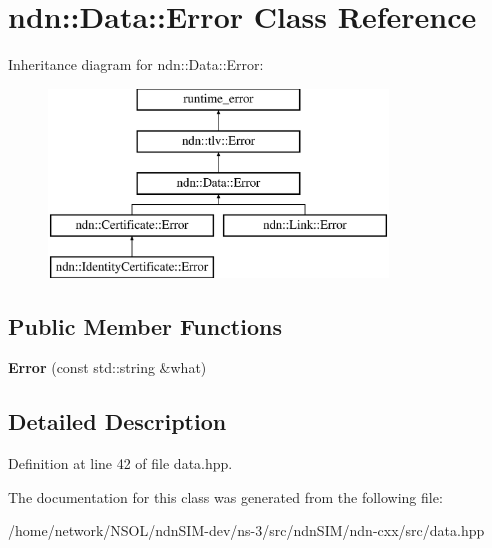 \hypertarget{classndn_1_1Data_1_1Error}{}\section{ndn\+:\+:Data\+:\+:Error Class Reference}
\label{classndn_1_1Data_1_1Error}
Inheritance diagram for ndn\+:\+:Data\+:\+:Error\+:\begin{figure}[H]
\begin{center}
\leavevmode
\includegraphics[height=5.000000cm]{classndn_1_1Data_1_1Error}
\end{center}
\end{figure}
\subsection*{Public Member Functions}
\begin{DoxyCompactItemize}
\item 
{\bfseries Error} (const std\+::string \&what)\hypertarget{classndn_1_1Data_1_1Error_a0fe79d12a9a277d18c852e9106780dc1}{}\label{classndn_1_1Data_1_1Error_a0fe79d12a9a277d18c852e9106780dc1}

\end{DoxyCompactItemize}


\subsection{Detailed Description}


Definition at line 42 of file data.\+hpp.



The documentation for this class was generated from the following file\+:\begin{DoxyCompactItemize}
\item 
/home/network/\+N\+S\+O\+L/ndn\+S\+I\+M-\/dev/ns-\/3/src/ndn\+S\+I\+M/ndn-\/cxx/src/data.\+hpp\end{DoxyCompactItemize}
